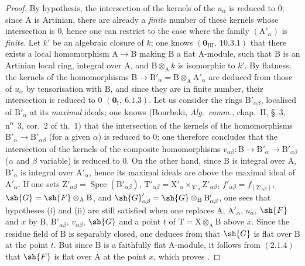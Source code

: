 \begin{proof}
By hypothesis, the intersection of the kernels of the $u_\alpha$ is reduced to $0$; since $\mathrm{A}$ is Artinian,
there are already a \emph{finite} number of these kernels whose intersection is $0$, hence one can
restrict to the case where the family $(\mathrm{A}'_\alpha)$ is \emph{finite}. Let $k'$ be an algebraic closure of $k$; one knows
$(\mathbf{0}_{\mathrm{III}},~10.3.1)$ that there exists a local homomorphism $\mathrm{A}\to\mathrm{B}$ making $\mathrm{B}$ a flat $\mathrm{A}$-module,
such that $\mathrm{B}$ is an Artinian local ring, integral over $\mathrm{A}$, and $\mathrm{B}\otimes_\mathrm{A} k$ is isomorphic to $k'$.
By flatness, the kernels of the homomorphisms $\mathrm{B}\to\mathrm{B}'_\alpha=\mathrm{B}\otimes_\mathrm{A}\mathrm{A}'_\alpha$ are deduced from those of
$u_\alpha$ by tensorisation with $\mathrm{B}$, and since they are in finite number, their intersection is
reduced to $0$ $(\mathbf{0}_\mathrm{I},~6.1.3)$. Let us consider the rings $\mathrm{B}'_{\alpha\beta}$, localised of $\mathrm{B}'_\alpha$ at its \emph{maximal} ideals;
one knows (Bourbaki, \emph{Alg.\ comm.}, chap.~II, \S~3, n\textsuperscript{o}~3, cor.~2 of th.~1) that the intersection
of the kernels of the homomorphisms $\mathrm{B}'_\alpha\to\mathrm{B}'_{\alpha\beta}$ (for a given $\alpha$) is reduced to $0$; one therefore concludes
that the intersection of the kernels of the composite homomorphisms $v_{\alpha\beta}:\mathrm{B}\to\mathrm{B}'_\alpha\to\mathrm{B}'_{\alpha\beta}$ ($\alpha$ and
$\beta$ variable) is reduced to $0$. On the other hand, since $\mathrm{B}$ is integral over $\mathrm{A}$, $\mathrm{B}'_\alpha$ is integral over $\mathrm{A}'_\alpha$,
hence its maximal ideals are above the maximal ideal of $\mathrm{A}'_\alpha$. If one sets
$\mathrm{Z}'_{\alpha\beta}=\operatorname{Spec}(\mathrm{B}'_{\alpha\beta})$,
$\mathrm{T}'_{\alpha\beta}=\mathrm{X}'_\alpha\times_{\mathrm{Y}'_\alpha}\mathrm{Z}'_{\alpha\beta}$,
$f'_{\alpha\beta}=f_{(\mathrm{Z}'_{\alpha\beta})}$,
$\sh{G}=\sh{F}\otimes_\mathrm{A}\mathrm{B}$, and
$\sh{G}'_{\alpha\beta}=\sh{G}\otimes_\mathrm{B}\mathrm{B}'_{\alpha\beta}$, one sees
that hypotheses (i) and (ii) are still satisfied when one replaces
$\mathrm{A}$, $\mathrm{A}'_\alpha$, $u_\alpha$, $\sh{F}$ and $x$ by $\mathrm{B}$, $\mathrm{B}'_{\alpha\beta}$, $v_{\alpha\beta}$, $\sh{G}$ and a point $t$ of $\mathrm{T}=\mathrm{X}\otimes_\mathrm{A}\mathrm{B}$ above $x$.
Since the residue field of $\mathrm{B}$ is separably closed, one deduces from  that
$\sh{G}$ is flat over $\mathrm{B}$ at the point $t$. But since $\mathrm{B}$ is a faithfully flat $\mathrm{A}$-module, it follows from $(2.1.4)$
that $\sh{F}$ is flat over $\mathrm{A}$ at the point $x$, which proves .
\end{proof}

